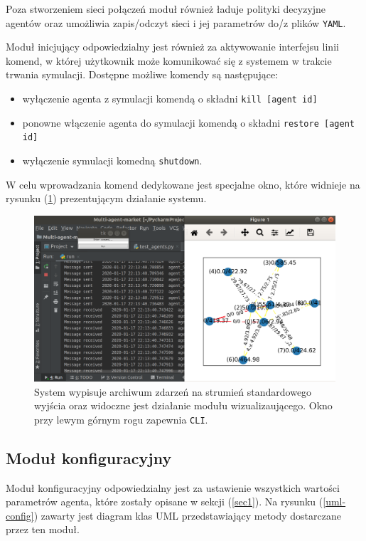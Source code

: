 \documentclass{article}
\begin{document}
Poza stworzeniem sieci połączeń moduł również ładuje polityki decyzyjne agentów oraz umożliwia zapis/odczyt sieci i jej parametrów
do/z plików \texttt{YAML}.


Moduł inicjujący odpowiedzialny jest również za aktywowanie interfejsu linii komend, w której użytkownik może komunikować się z systemem w trakcie trwania symulacji.
Dostępne możliwe komendy są następujące:

\begin{itemize}
	\item wyłączenie agenta z symulacji komendą o składni \texttt{kill [agent id]}
	\item ponowne włączenie agenta do symulacji komendą o składni \texttt{restore [agent id]}
	\item wyłączenie symulacji komedną \texttt{shutdown}.
\end{itemize}

W celu wprowadzania komend dedykowane jest specjalne okno, które widnieje na rysunku (\ref{run-image}) prezentującym działanie systemu.
\begin{figure}[H]
	\centering
	\includegraphics[width=\textwidth, height=0.5\textheight]{./png/run-image.png}
	\caption{System wypisuje archiwum zdarzeń na strumień standardowego wyjścia oraz widoczne jest działanie modułu wizualizaującego. Okno przy lewym górnym rogu zapewnia \texttt{CLI}.}
	\label{run-image}
\end{figure}


\subsection{Moduł konfiguracyjny}

Moduł konfiguracyjny odpowiedzialny jest za ustawienie wszystkich wartości parametrów agenta, które zostały  
opisane w sekcji (\ref{sec1}).
Na rysunku (\ref{uml-config}) zawarty jest diagram 
klas UML przedstawiający metody dostarczane przez ten moduł.
\end{document}
